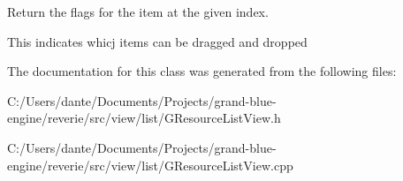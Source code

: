 Return the flags for the item at the given index. 

This indicates whicj items can be dragged and dropped 

The documentation for this class was generated from the following files\+:\begin{DoxyCompactItemize}
\item 
C\+:/\+Users/dante/\+Documents/\+Projects/grand-\/blue-\/engine/reverie/src/view/list/G\+Resource\+List\+View.\+h\item 
C\+:/\+Users/dante/\+Documents/\+Projects/grand-\/blue-\/engine/reverie/src/view/list/G\+Resource\+List\+View.\+cpp\end{DoxyCompactItemize}
